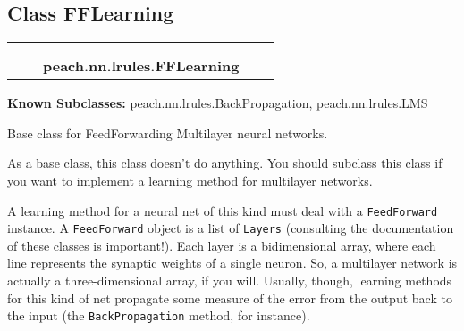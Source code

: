 
\subsection{Class FFLearning}

    \label{peach:nn:lrules:FFLearning}
\begin{tabular}{cccccc}
\multicolumn{2}{r}{\settowidth{\BCL}{object}\multirow{2}{\BCL}{object}}
&&
  \\\cline{3-3}
  &&\multicolumn{1}{c|}{}
&&
  \\
&&\multicolumn{2}{l}{\textbf{peach.nn.lrules.FFLearning}}
\end{tabular}

\textbf{Known Subclasses:}
peach.nn.lrules.BackPropagation,
    peach.nn.lrules.LMS


Base class for FeedForwarding Multilayer neural networks.

As a base class, this class doesn't do anything. You should subclass this
class if you want to implement a learning method for multilayer networks.

A learning method for a neural net of this kind must deal with a
\texttt{FeedForward} instance. A \texttt{FeedForward} object is a list of \texttt{Layers}
(consulting the documentation of these classes is important!). Each layer is
a bidimensional array, where each line represents the synaptic weights of a
single neuron. So, a multilayer network is actually a three-dimensional
array, if you will. Usually, though, learning methods for this kind of net
propagate some measure of the error from the output back to the input (the
\texttt{BackPropagation} method, for instance).

